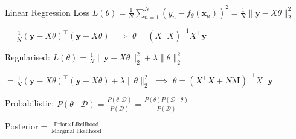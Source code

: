 \documentclass[UTF8,a4paper]{article}
\begin{document}
\begin{cheatsheetblock}{Linear Regression}
    Loss \hfill $L(\theta)=\frac{1}{N} \sum_{n=1}^N\left(y_n-f_\theta\left(\mathbf{x}_n\right)\right)^2=\frac{1}{N}\|\mathbf{y}-X \theta\|_2^2$ 
    
    $=\frac{1}{N}(\mathbf{y}-X \theta)^{\top}(\mathbf{y}-X \theta)$ \hfill $\implies$ \hfill $\theta=\left(X^{\top} X\right)^{-1} X^{\top} \mathbf{y}$

    Regularised: \hfill $L(\theta)=\frac{1}{N}\|\mathbf{y}-X \theta\|_2^2+\lambda\|\theta\|_2^2$ 
    
    $=\frac{1}{N}(\mathbf{y}-X \theta)^{\top}(\mathbf{y}-X \theta)+\lambda\|\theta\|_2^2$ \hfill $\implies$ \hfill $\theta=\left(X^{\top} X+N \lambda \mathbf{I}\right)^{-1} X^{\top} \mathbf{y}$

    Probabilistic: \hfill $P(\theta \mid \mathscr{D})=\frac{P(\theta, \mathscr{D})}{P(\mathscr{D})}=\frac{P(\theta) P(\mathscr{D} \mid \theta)}{P(\mathscr{D})}$

    \hfill $\text{Posterior} = \frac{\text{Prior} \times \text{Likelihood}}{\text{Marginal likelihood}}$
\end{cheatsheetblock}

\end{document}

